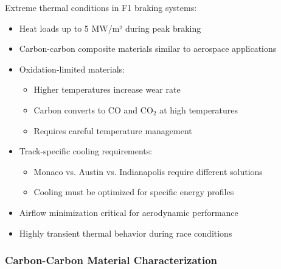 Extreme thermal conditions in F1 braking systems:
\begin{itemize}
    \item Heat loads up to 5 MW/m² during peak braking
    \item Carbon-carbon composite materials similar to aerospace applications
    \item Oxidation-limited materials:
    \begin{itemize}
        \item Higher temperatures increase wear rate
        \item Carbon converts to $\mathrm{CO}$ and $\mathrm{CO}_2$ at high temperatures
        \item Requires careful temperature management
    \end{itemize}
    \item Track-specific cooling requirements:
    \begin{itemize}
        \item Monaco vs. Austin vs. Indianapolis require different solutions
        \item Cooling must be optimized for specific energy profiles
    \end{itemize}
    \item Airflow minimization critical for aerodynamic performance
    \item Highly transient thermal behavior during race conditions
\end{itemize}

\subsubsection*{Carbon-Carbon Material Characterization}

